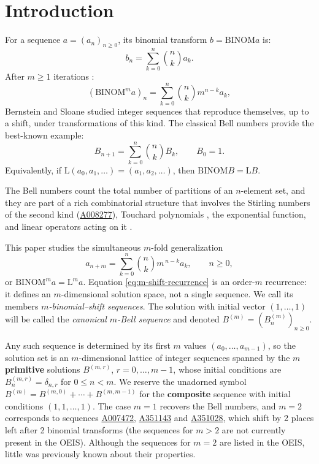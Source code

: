 \documentclass[a4paper]{amsart}
\numberwithin{equation}{section}
\newcommand{\BINOM}{\mathrm{BINOM}}
\newcommand{\Lshift}{\mathrm{L}}
\begin{document}
\section{Introduction}\label{sec-introduction}
For a sequence  $a = (a_n)_{n \geq 0}$, its binomial transform $b = \mathrm{BINOM}a$ is:
%
\begin{equation*}
    b_n = \sum_{k=0}^{n} \binom{n}{k} a_k.
\end{equation*}
%
After $m \ge 1$ iterations \cite{spiveyKbinomialTransformsHankel2006}:
%
\begin{equation*}
    (\mathrm{BINOM}^m a)_n =\sum_{k=0}^{n} \binom{n}{k} m^{n-k} a_k,
\end{equation*}
%
Bernstein and Sloane \cite{bernstein1995} studied integer sequences that reproduce themselves, up to a shift, under transformations of this kind. The classical Bell numbers provide the best-known example:
%
\begin{equation}\label{eq-bell-recurrence}
B_{n+1}=\sum_{k=0}^n\binom{n}{k}B_k,
\qquad B_0=1.
\end{equation}
%
Equivalently, if $\Lshift(a_0,a_1,\ldots)=(a_1,a_2,\ldots)$, then $\BINOM B=\Lshift B$.

The Bell numbers count the total number of partitions of an $n$-element set, and they are part of a rich combinatorial structure that involves the Stirling numbers of the second kind (\href{https://oeis.org/A008277}{A008277}), Touchard polynomials \cite{weisstein}, the exponential function, and linear operators acting on it \cite{dattoliTouchardPolynomialsGeneralized2010}.

This paper studies the simultaneous $m$-fold generalization
%
\begin{equation}\label{eq:m-shift-recurrence}
a_{n+m}=\sum_{k=0}^n\binom{n}{k}m^{\,n-k}a_k,
\qquad n\geq0,
\end{equation}
%
or $\BINOM^m a=\Lshift^m a$. Equation \eqref{eq:m-shift-recurrence} is an order-$m$ recurrence: it defines an $m$-dimensional solution space, not a single sequence. We call its members \emph{$m$-binomial--shift sequences}. The solution with initial vector $(1,\ldots,1)$ will be called the \emph{canonical $m$-Bell sequence} and denoted $B^{(m)}=(B_n^{(m)})_{n\geq0}$.

Any such sequence is determined by its first $m$ values $(a_0,\ldots,a_{m-1})$, so the solution set is an $m$-dimensional lattice of integer sequences spanned by the $m$ \textbf{primitive} solutions $B^{(m,r)}$, $r = 0, \ldots, m-1$, whose initial conditions are $B^{(m,r)}_n = \delta_{n,r}$ for $0 \le n < m$. We reserve the unadorned symbol $B^{(m)} = B^{(m,0)} + \cdots + B^{(m,m-1)}$ for the \textbf{composite} sequence with initial conditions $(1,1,\ldots,1)$. The case $m=1$ recovers the Bell numbers, and $m=2$ corresponds to sequences \href{https://oeis.org/A007472}{A007472}, \href{https://oeis.org/A351143}{A351143} and \href{https://oeis.org/A351028}{A351028}, which shift by 2 places left after 2 binomial transforms (the sequences for $m>2$ are not currently present in the OEIS). Although the sequences for $m=2$ are listed in the OEIS, little was previously known about their properties.
\end{document}
